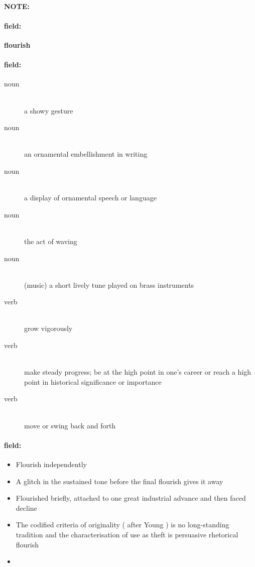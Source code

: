\documentclass[12pt]{article}
\newenvironment{note}{\paragraph{NOTE:}}{}
\newenvironment{field}{\paragraph{field:}}{}
\begin{document}
\begin{note}
\begin{field}
\textbf{\large flourish}
\end{field}


\begin{field}
\begin{description}
\item[noun] \hfill \\ 
a showy gesture

\item[noun] \hfill \\ 
an ornamental embellishment in writing

\item[noun] \hfill \\ 
a display of ornamental speech or language

\item[noun] \hfill \\ 
the act of waving

\item[noun] \hfill \\ 
(music) a short lively tune played on brass instruments

\item[verb] \hfill \\ 
grow vigorously

\item[verb] \hfill \\ 
make steady progress; be at the high point in one's career or reach a high point in historical significance or importance

\item[verb] \hfill \\ 
move or swing back and forth

\end{description}
\end{field}

\begin{field}
\begin{itemize}
\item Flourish independently
\item A glitch in the sustained tone before the final flourish gives it away
\item Flourished briefly, attached to one great industrial advance and then faced decline
\item The codified criteria of originality ( after Young ) is no long-standing tradition and the characterisation of use as theft is persuasive rhetorical flourish
\item 
\end{itemize}
\end{field}
\end{note}
\end{document}
